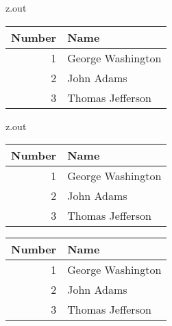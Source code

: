 \MyIO


\begin{VerbatimOut}{z.out}


\newpage

\setlength{\LTcapwidth}{\textwidth}
\addtolength{\LTcapwidth}{-4\parindent}

\newlength{\twidth}
\newlength{\theight}

\setlength{\twidth}{\textwidth}
\setlength{\theight}{\textheight}

\begin{sidewaystable}
  \setlength{\textwidth}{\theight}
  \setlength{\textheight}{\twidth}
  \caption{Sidewaystable of the first three American Presidents.}
  \vspace*{6pt}
  \centering
    \begin{tabular}{@{}rl@{}}
      \toprule
      \bf Number& \bf Name\\
      \midrule
      1& George Washington\\
      2& John Adams\\
      3& Thomas Jefferson\\
      \bottomrule
    \end{tabular}
\end{sidewaystable}
\end{VerbatimOut}

\MyIO

\begin{VerbatimOut}{z.out}
\begin{sidewaystable}
  \setlength{\textwidth}{\theight}
  \setlength{\textheight}{\twidth}
  \caption{Two tables can be placed vertically in a sidewaystable environment.}
  \vspace*{6pt}
  \centering
    \begin{tabular}{@{}rl@{}}
      \toprule
      \bf Number& \bf Name\\
      \midrule
      1& George Washington\\
      2& John Adams\\
      3& Thomas Jefferson\\
      \bottomrule
    \end{tabular}
  \vspace*{2\baselineskip}
  \caption{This is the second table in the sideways environment.}
  \vspace*{6pt}
    \begin{tabular}{@{}rl@{}}
      \toprule
      \bf Number& \bf Name\\
      \midrule
      1& George Washington\\
      2& John Adams\\
      3& Thomas Jefferson\\
      \bottomrule
    \end{tabular}
\end{sidewaystable}
\end{VerbatimOut}

